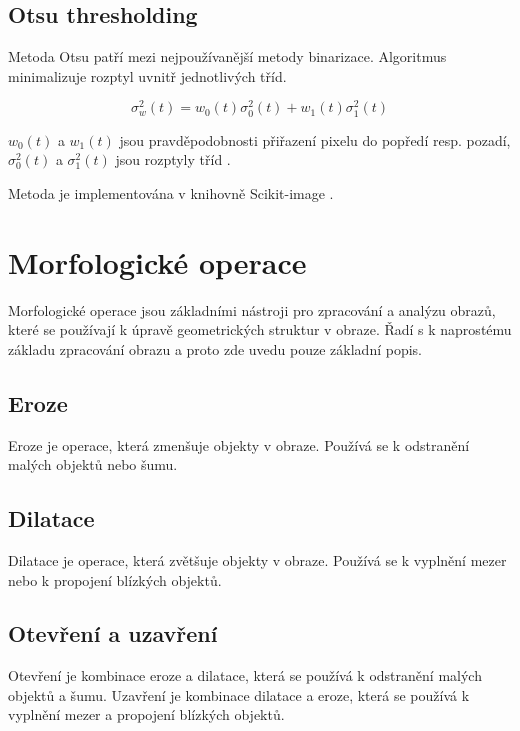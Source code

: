 
\subsection{Otsu thresholding}

Metoda Otsu patří mezi nejpoužívanější metody binarizace. Algoritmus minimalizuje rozptyl uvnitř jednotlivých tříd.

\begin{equation}
    \sigma^2_w(t) = w_0(t)\sigma_0^2(t) + w_1(t)\sigma_1^2(t)
\end{equation}

$w_0(t)$ a $w_1(t)$ jsou pravděpodobnosti přiřazení pixelu do popředí resp. pozadí,
$\sigma_0^2(t)$ a $\sigma_1^2(t)$ jsou rozptyly tříd \cite{MopVANszPoidRZfR}.

Metoda je implementována v knihovně Scikit-image \cite{NEbfP3AWk7ALQfWN}.

\section{Morfologické operace}

Morfologické operace jsou základními nástroji pro zpracování a analýzu obrazů, které se používají k úpravě geometrických struktur v obraze. Řadí s k naprostému základu zpracování obrazu a proto zde uvedu pouze základní popis.

\subsection{Eroze}

Eroze je operace, která zmenšuje objekty v obraze. Používá se k odstranění malých objektů nebo šumu.

\subsection{Dilatace}

Dilatace je operace, která zvětšuje objekty v obraze. Používá se k vyplnění mezer nebo k propojení blízkých objektů.

\subsection{Otevření a uzavření}

Otevření je kombinace eroze a dilatace, která se používá k odstranění malých objektů a šumu. Uzavření je kombinace dilatace a eroze, která se používá k vyplnění mezer a propojení blízkých objektů.


